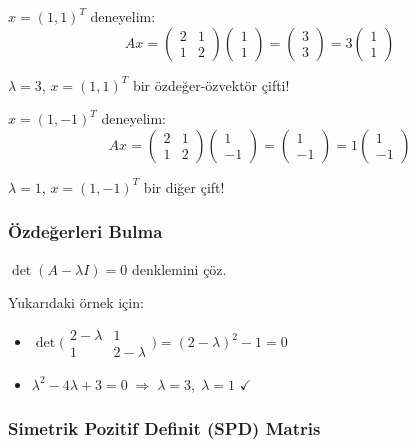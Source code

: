 \documentclass[12pt,a4paper]{article}
\theoremstyle{definition}
\theoremstyle{remark}
\begin{document}
$x = (1, 1)^T$ deneyelim:
\[
Ax = \begin{pmatrix} 2 & 1 \\ 1 & 2 \end{pmatrix} \begin{pmatrix} 1 \\ 1 \end{pmatrix} = \begin{pmatrix} 3 \\ 3 \end{pmatrix} = 3 \begin{pmatrix} 1 \\ 1 \end{pmatrix}
\]

$\lambda = 3$, $x = (1,1)^T$ bir \"ozde\u{g}er-\"ozvekt\"or \c{c}ifti!

$x = (1, -1)^T$ deneyelim:
\[
Ax = \begin{pmatrix} 2 & 1 \\ 1 & 2 \end{pmatrix} \begin{pmatrix} 1 \\ -1 \end{pmatrix} = \begin{pmatrix} 1 \\ -1 \end{pmatrix} = 1 \begin{pmatrix} 1 \\ -1 \end{pmatrix}
\]

$\lambda = 1$, $x = (1,-1)^T$ bir di\u{g}er \c{c}ift!

\subsubsection{\"Ozde\u{g}erleri Bulma}
$\det(A - \lambda I) = 0$ denklemini \c{c}\"oz.

Yukar{\i}daki \"ornek i\c{c}in:
\begin{itemize}
    \item $\det\!\bigl(\begin{smallmatrix} 2-\lambda & 1 \\ 1 & 2-\lambda \end{smallmatrix}\bigr) = (2-\lambda)^2 - 1 = 0$
    \item $\lambda^2 - 4\lambda + 3 = 0 \;\Rightarrow\; \lambda = 3,\; \lambda = 1$ $\checkmark$
\end{itemize}

\subsubsection{Simetrik Pozitif Definit (SPD) Matris}
\end{document}
